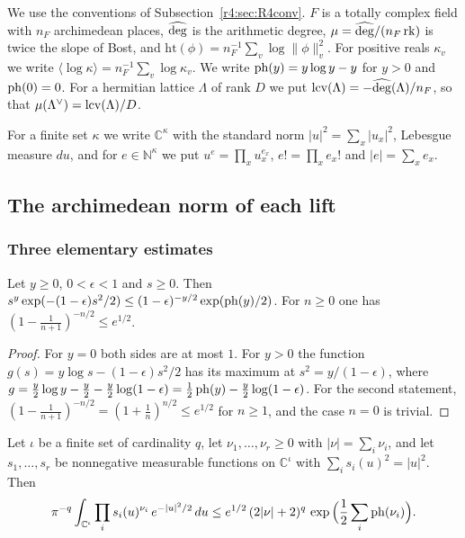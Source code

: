 We use the conventions of Subsection~\ref{r4:sec:R4conv}. $F$ is a totally complex field with $n_F$ archimedean places, $\widehat{\deg}$ is the arithmetic degree, $\mu=\widehat{\deg}/(n_F\operatorname{rk})$ is twice the slope of Bost, and $\mathrm{ht}(\phi)=n_F^{-1}\sum_v\log\lVert\phi\rVert_v^2$. For positive reals $\kappa_v$ we write $\langle\log\kappa\rangle=n_F^{-1}\sum_v\log\kappa_v$. We write $\operatorname{ph}(y)=y\log y-y$ for $y>0$ and $\operatorname{ph}(0)=0$. For a hermitian lattice $\Lambda$ of rank $D$ we put $\operatorname{lcv}(\Lambda)=-\widehat{\deg}(\Lambda)/n_F$, so that $\mu(\Lambda^\vee)=\operatorname{lcv}(\Lambda)/D$.

For a finite set $\kappa$ we write $\mathbb C^\kappa$ with the standard norm $\lvert u\rvert^2=\sum_x\lvert u_x\rvert^2$, Lebesgue measure $du$, and for $e\in\mathbb N^\kappa$ we put $u^e=\prod_xu_x^{e_x}$, $e!=\prod_xe_x!$ and $\lvert e\rvert=\sum_xe_x$.

\subsection{The archimedean norm of each lift}\label{w3:sec:HK}

\subsubsection{Three elementary estimates}

\begin{lemma}\label{w3:W3:shift}
Let $y\ge0$, $0<\epsilon<1$ and $s\ge0$. Then $s^y\exp(-(1-\epsilon)s^2/2)\le(1-\epsilon)^{-y/2}\exp(\operatorname{ph}(y)/2)$. For $n\ge0$ one has $(1-\frac1{n+1})^{-n/2}\le e^{1/2}$.
\end{lemma}

\begin{proof}
For $y=0$ both sides are at most $1$. For $y>0$ the function $g(s)=y\log s-(1-\epsilon)s^2/2$ has its maximum at $s^2=y/(1-\epsilon)$, where $g=\frac y2\log y-\frac y2-\frac y2\log(1-\epsilon)=\frac12\operatorname{ph}(y)-\frac y2\log(1-\epsilon)$. For the second statement, $(1-\frac1{n+1})^{-n/2}=(1+\frac1n)^{n/2}\le e^{1/2}$ for $n\ge1$, and the case $n=0$ is trivial.
\end{proof}

\begin{lemma}\label{w3:W3:gauss}
Let $\iota$ be a finite set of cardinality $q$, let $\nu_1,\dots,\nu_r\ge0$ with $\lvert\nu\rvert=\sum_i\nu_i$, and let $s_1,\dots,s_r$ be nonnegative measurable functions on $\mathbb C^\iota$ with $\sum_is_i(u)^2=\lvert u\rvert^2$. Then
\[
\pi^{-q}\int_{\mathbb C^\iota}\prod_is_i(u)^{\nu_i}\,e^{-\lvert u\rvert^2/2}\,du\le e^{1/2}\,(2\lvert\nu\rvert+2)^{q}\,\exp\Big(\frac12\sum_i\operatorname{ph}(\nu_i)\Big).
\]
\end{lemma}

